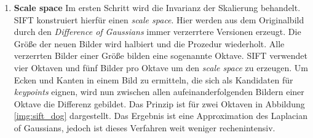 \begin{enumerate}
	\item \textbf{Scale space} Im ersten Schritt wird die Invarianz der Skalierung behandelt. SIFT konstruiert hierfür einen \textit{scale space}. Hier werden aus dem Originalbild durch den \textit{Difference of Gaussians} immer verzerrtere Versionen erzeugt. Die Größe der neuen Bilder wird halbiert und die Prozedur wiederholt. Alle verzerrten Bilder einer Größe bilden eine sogenannte Oktave. SIFT verwendet vier Oktaven und fünf Bilder pro Oktave um den \textit{scale space} zu erzeugen. Um Ecken und Kanten in einem Bild zu ermitteln, die sich als Kandidaten für \textit{keypoints} eignen, wird nun zwischen allen aufeinanderfolgenden Bildern einer Oktave die Differenz gebildet. Das Prinzip ist für zwei Oktaven in Abbildung \ref{img:sift_dog} dargestellt. Das Ergebnis ist eine Approximation des Laplacian of Gaussians, jedoch ist dieses Verfahren weit weniger rechenintensiv. 


\end{enumerate}
